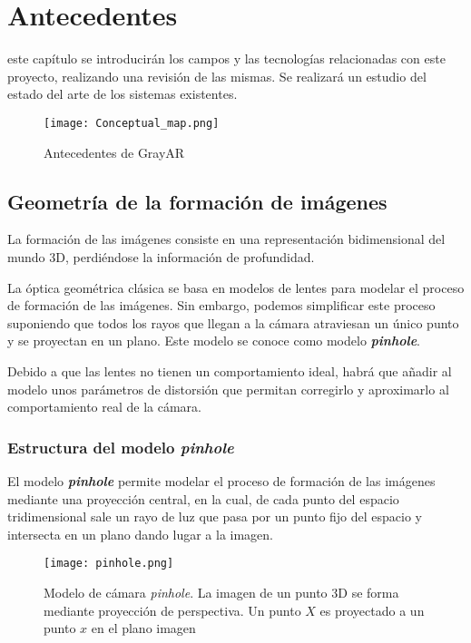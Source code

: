 \chapter{Antecedentes}\label{chap:antecedentes}
 este capítulo se introducirán los campos y las tecnologías relacionadas con este
proyecto, realizando una revisión de las mismas. Se realizará un estudio del estado del
arte de los sistemas existentes.

\begin{figure}[h!] 
  \centering
  \texttt{[image: Conceptual\_map.png]}
  \caption{Antecedentes de GrayAR}
  \label{fig:antecedentes}
\end{figure}
 
\section{Geometría de la formación de imágenes}
La formación de las imágenes consiste en una representación bidimensional del mundo 3D, perdiéndose la información de profundidad.

La óptica geométrica clásica se basa en modelos de lentes para modelar el proceso de formación de las imágenes. Sin embargo, podemos simplificar este proceso suponiendo que todos los rayos que llegan a la cámara atraviesan un único punto y se proyectan en un plano. Este modelo se conoce como modelo \textbf{\textit{pinhole}}.

Debido a que las lentes no tienen un comportamiento ideal, habrá que añadir al modelo unos parámetros de distorsión que permitan corregirlo y aproximarlo al comportamiento real de la cámara.

\subsection{Estructura del modelo \textit{pinhole}}
El modelo \textbf{\textit{pinhole}} \cite{Hartley} permite modelar el proceso de formación de las imágenes mediante una proyección central, en la cual, de cada punto del espacio tridimensional sale un rayo de luz que pasa por un punto fijo del espacio y intersecta en un plano dando lugar a la imagen.

\begin{figure}[h]
  \centering
  \texttt{[image: pinhole.png]}
  \caption{Modelo de cámara \textit{pinhole}. La imagen de un punto 3D se forma mediante proyección de perspectiva. Un punto $X$ es proyectado a un punto $x$ en el plano imagen}
  \label{fig:pinholeCamera}
\end{figure}

